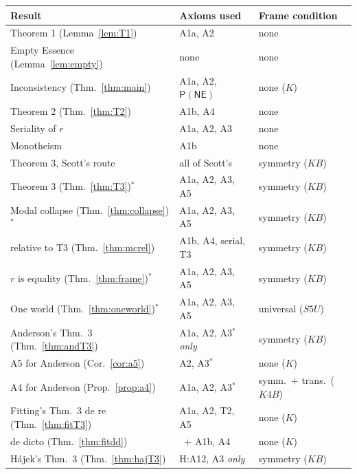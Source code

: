 \documentclass[11pt]{article}
\theoremstyle{plain}
\theoremstyle{definition}
\newcommand{\NE}{\mathsf{NE}}
\newcommand{\Pos}{\mathsf{P}}
\begin{document}
\begin{center}
\begin{tabular}{@{}lll@{}}
\toprule
Result & Axioms used & Frame condition \\
\midrule
Theorem 1 (Lemma~\ref{lem:T1})        & A1a, A2                 & none \\
Empty Essence (Lemma~\ref{lem:empty}) & none                    & none \\
Inconsistency (Thm.~\ref{thm:main})   & A1a, A2, $\Pos(\NE)$    & none \quad($K$) \\
Theorem 2 (Thm.~\ref{thm:T2})         & A1b, A4                 & none \\
Seriality of $r$                      & A1a, A2, A3             & none \\
Monotheism                            & A1b                     & none \\
Theorem 3, Scott's route              & all of Scott's          & symmetry \quad($KB$) \\
Theorem 3 (Thm.~\ref{thm:T3})$^{\ast}$ & A1a, A2, A3, A5        & symmetry \quad($KB$) \\
Modal collapse (Thm.~\ref{thm:collapse})$^{\ast}$ & A1a, A2, A3, A5 & symmetry \quad($KB$) \\
\quad relative to T3 (Thm.~\ref{thm:mcrel}) & A1b, A4, serial, T3 & symmetry \quad($KB$) \\
$r$ is equality (Thm.~\ref{thm:frame})$^{\ast}$ & A1a, A2, A3, A5 & symmetry \quad($KB$) \\
One world (Thm.~\ref{thm:oneworld})$^{\ast}$ & A1a, A2, A3, A5   & universal \quad($S5U$) \\
\midrule
Anderson's Thm.~3 (Thm.~\ref{thm:andT3}) & A1a, A2, A3$^{*}$ \emph{only} & symmetry \quad($KB$) \\
\quad A5 for Anderson (Cor.~\ref{cor:a5}) & A2, A3$^{*}$        & none \quad($K$) \\
\quad A4 for Anderson (Prop.~\ref{prop:a4}) & A1a, A2, A3$^{*}$ & symm.\ + trans.\ \quad($K4B$) \\
Fitting's Thm.~3 de re (Thm.~\ref{thm:fitT3}) & A1a, A2, T2, A5 & none \quad($K$) \\
\quad de dicto (Thm.~\ref{thm:fitdd}) & \ $+$ A1b, A4            & none \quad($K$) \\
H\'ajek's Thm.~3 (Thm.~\ref{thm:hajT3})  & H:A12, A3 \emph{only} & symmetry \quad($KB$) \\
\bottomrule
\end{tabular}
\end{center}
\end{document}
